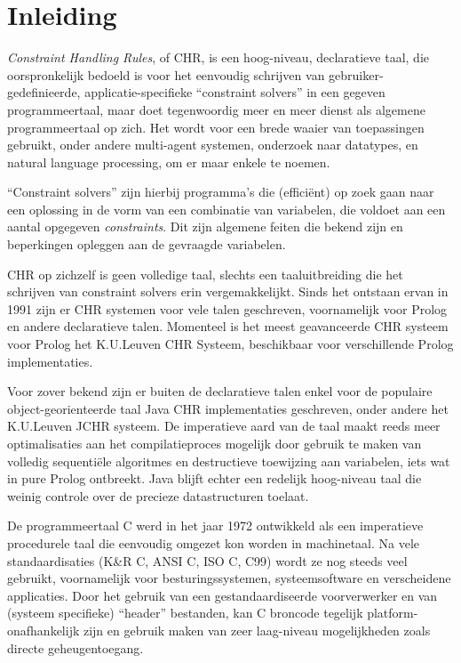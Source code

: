 \chapter{Inleiding}
\label{chap:inleiding}

{\em Constraint Handling Rules}, of CHR, is een hoog-niveau, declaratieve taal, die oorspronkelijk bedoeld is voor het eenvoudig schrijven van gebruiker-gedefinieerde, applicatie-specifieke ``constraint solvers'' in een gegeven programmeertaal, maar doet tegenwoordig meer en meer dienst als algemene programmeertaal op zich. Het wordt voor een brede waaier van toepassingen gebruikt, onder andere multi-agent systemen, onderzoek naar datatypes, en natural language processing, om er maar enkele te noemen.

``Constraint solvers'' zijn hierbij programma's die (effici\"ent) op zoek gaan naar een oplossing in de vorm van een combinatie van variabelen, die voldoet aan een aantal opgegeven {\em constraints}. Dit zijn algemene feiten die bekend zijn en beperkingen opleggen aan de gevraagde variabelen.

CHR op zichzelf is geen volledige taal, slechts een taaluitbreiding die het schrijven van constraint solvers erin vergemakkelijkt. Sinds het ontstaan ervan in 1991 zijn er CHR systemen voor vele talen geschreven, voornamelijk voor Prolog en andere declaratieve talen. Momenteel is het meest geavanceerde CHR systeem voor Prolog het K.U.Leuven CHR Systeem, beschikbaar voor verschillende Prolog implementaties. 

Voor zover bekend zijn er buiten de declaratieve talen enkel voor de populaire object-georienteerde taal Java CHR implementaties geschreven, onder andere het K.U.Leuven JCHR systeem. De imperatieve aard van de taal maakt reeds meer optimalisaties aan het compilatieproces mogelijk door gebruik te maken van volledig sequenti\"ele algoritmes en destructieve toewijzing aan variabelen, iets wat in pure Prolog ontbreekt. Java blijft echter een redelijk hoog-niveau taal die weinig controle over de precieze datastructuren toelaat.

De programmeertaal C werd in het jaar 1972 ontwikkeld als een imperatieve procedurele taal die eenvoudig omgezet kon worden in machinetaal. Na vele standaardisaties (K\&R C, ANSI C, ISO C, C99) wordt ze nog steeds veel gebruikt, voornamelijk voor besturingssystemen, systeemsoftware en verscheidene applicaties. Door het gebruik van een gestandaardiseerde voorverwerker en van (systeem specifieke) ``header'' bestanden, kan C broncode tegelijk platform-onafhankelijk zijn en gebruik maken van zeer laag-niveau mogelijkheden zoals directe geheugentoegang.


